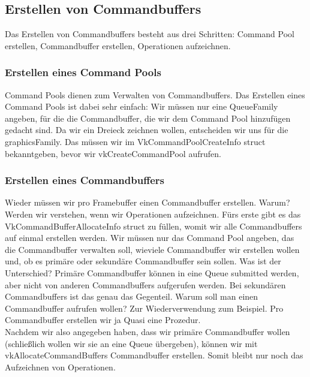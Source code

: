 \documentclass[11pt,a4paper]{report}
\begin{document}
\subsection{Erstellen von Commandbuffers}
Das Erstellen von Commandbuffers besteht aus drei Schritten: Command Pool erstellen, Commandbuffer erstellen, Operationen aufzeichnen.

\subsubsection{Erstellen eines Command Pools}
Command Pools dienen zum Verwalten von Commandbuffers. Das Erstellen eines Command Pools ist dabei sehr einfach: Wir müssen nur eine QueueFamily angeben, für die die Commandbuffer, die wir dem Command Pool hinzufügen gedacht sind. Da wir ein Dreieck zeichnen wollen, entscheiden wir uns für die graphicsFamily. Das müssen wir im VkCommandPoolCreateInfo struct bekanntgeben, bevor wir vkCreateCommandPool aufrufen.

\subsubsection{Erstellen eines Commandbuffers}
Wieder müssen wir pro Framebuffer einen Commandbuffer erstellen. Warum? Werden wir verstehen, wenn wir Operationen aufzeichnen. Fürs erste gibt es das VkCommandBufferAllocateInfo struct zu füllen, womit wir alle Commandbuffers auf einmal erstellen werden. Wir müssen nur das Command Pool angeben, das die Commandbuffer verwalten soll, wieviele Commandbuffer wir erstellen wollen und, ob es primäre oder sekundäre Commandbuffer sein sollen. Was ist der Unterschied? Primäre Commandbuffer können in eine Queue submitted werden, aber nicht von anderen Commandbuffers aufgerufen werden. Bei sekundären Commandbuffers ist das genau das Gegenteil. Warum soll man einen Commandbuffer aufrufen wollen? Zur Wiederverwendung zum Beispiel. Pro Commandbuffer erstellen wir ja Quasi eine Prozedur.\\
Nachdem wir also angegeben haben, dass wir primäre Commandbuffer wollen (schließlich wollen wir sie an eine Queue übergeben), können wir mit vkAllocateCommandBuffers Commandbuffer erstellen. Somit bleibt nur noch das Aufzeichnen von Operationen.
\end{document}
